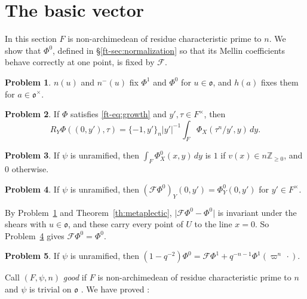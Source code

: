 \documentclass[reqno]{amsart}
\newcommand{\Fc}{\mathcal{F}}
\newcommand{\oo}{\mathfrak{o}}
\numberwithin{equation}{section}
\theoremstyle{definition}
\newtheorem{problem}{Problem}[section]
\theoremstyle{plain}
\begin{document}
\section{The basic vector}\label{sec:basic}

In this section $F$ is non-archimedean of residue characteristic prime to $n$.  We show that $\Phi^0$, defined in \S\ref{ft-sec:normalization} so that its Mellin coefficients behave correctly at one point, is fixed by $\Fc$.

\begin{problem}\label{pr:basic-invariant}
  $n(u)$ and $n^-(u)$ fix $\Phi^1$ and $\Phi^0$ for $u \in \oo$, and $h(a)$ fixes them for $a \in \oo^\times$.
\end{problem}

\begin{problem}\label{pr:axis-line}
  If $\Phi$ satisfies \eqref{ft-eq:growth} and $y', \tau \in F^\times$, then
  \begin{equation*}
    R_Y \Phi((0, y'), \tau) = \{-1, y'\}_n \lvert y' \rvert^{-1} \int_F \Phi_X(\tau^n / y', y) \, d y.
  \end{equation*}
\end{problem}

\begin{problem}\label{pr:basic-marginal}
  If $\psi$ is unramified, then $\int_F \Phi^0_X(x, y) \, d y$ is $1$ if $v(x) \in n \mathbb{Z}_{\geq 0}$, and $0$ otherwise.
\end{problem}

\begin{problem}\label{pr:basic-axis-values}
  If $\psi$ is unramified, then $(\Fc \Phi^0)_Y(0, y') = \Phi^0_Y(0, y')$ for $y' \in F^\times$.
\end{problem}

By Problem~\ref{pr:basic-invariant} and Theorem~\ref{th:metaplectic}, $\lvert \Fc \Phi^0 - \Phi^0 \rvert$ is invariant under the shears with $u \in \oo$, and these carry every point of $U$ to the line $x = 0$.  So Problem~\ref{pr:basic-axis-values} gives $\Fc \Phi^0 = \Phi^0$.

\begin{problem}\label{pr:basic-in-S}
  If $\psi$ is unramified, then $(1 - q^{-2}) \Phi^0 = \Fc \Phi^1 + q^{-n-1} \Phi^1(\varpi^n \, \cdot)$.
\end{problem}

Call $(F, \psi, n)$ \emph{good} if $F$ is non-archimedean of residue characteristic prime to $n$ and $\psi$ is trivial on $\oo$ \cite[Definition~6.4]{N}.  We have proved \cite[Proposition~6.3, Corollary~6.5]{N}:
\end{document}
